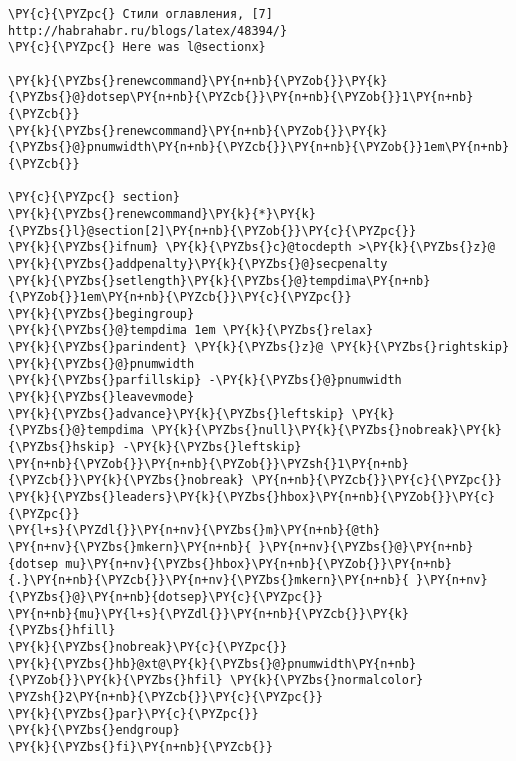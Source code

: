\begin{Verbatim}[commandchars=\\\{\}]
\PY{c}{\PYZpc{} Стили оглавления, [7] http://habrahabr.ru/blogs/latex/48394/}
\PY{c}{\PYZpc{} Here was l@sectionx}

\PY{k}{\PYZbs{}renewcommand}\PY{n+nb}{\PYZob{}}\PY{k}{\PYZbs{}@}dotsep\PY{n+nb}{\PYZcb{}}\PY{n+nb}{\PYZob{}}1\PY{n+nb}{\PYZcb{}}
\PY{k}{\PYZbs{}renewcommand}\PY{n+nb}{\PYZob{}}\PY{k}{\PYZbs{}@}pnumwidth\PY{n+nb}{\PYZcb{}}\PY{n+nb}{\PYZob{}}1em\PY{n+nb}{\PYZcb{}}

\PY{c}{\PYZpc{} section}
\PY{k}{\PYZbs{}renewcommand}\PY{k}{*}\PY{k}{\PYZbs{}l}@section[2]\PY{n+nb}{\PYZob{}}\PY{c}{\PYZpc{}}
\PY{k}{\PYZbs{}ifnum} \PY{k}{\PYZbs{}c}@tocdepth >\PY{k}{\PYZbs{}z}@
\PY{k}{\PYZbs{}addpenalty}\PY{k}{\PYZbs{}@}secpenalty
\PY{k}{\PYZbs{}setlength}\PY{k}{\PYZbs{}@}tempdima\PY{n+nb}{\PYZob{}}1em\PY{n+nb}{\PYZcb{}}\PY{c}{\PYZpc{}}
\PY{k}{\PYZbs{}begingroup}
\PY{k}{\PYZbs{}@}tempdima 1em \PY{k}{\PYZbs{}relax}
\PY{k}{\PYZbs{}parindent} \PY{k}{\PYZbs{}z}@ \PY{k}{\PYZbs{}rightskip} \PY{k}{\PYZbs{}@}pnumwidth
\PY{k}{\PYZbs{}parfillskip} -\PY{k}{\PYZbs{}@}pnumwidth
\PY{k}{\PYZbs{}leavevmode}
\PY{k}{\PYZbs{}advance}\PY{k}{\PYZbs{}leftskip} \PY{k}{\PYZbs{}@}tempdima \PY{k}{\PYZbs{}null}\PY{k}{\PYZbs{}nobreak}\PY{k}{\PYZbs{}hskip} -\PY{k}{\PYZbs{}leftskip}
\PY{n+nb}{\PYZob{}}\PY{n+nb}{\PYZob{}}\PYZsh{}1\PY{n+nb}{\PYZcb{}}\PY{k}{\PYZbs{}nobreak} \PY{n+nb}{\PYZcb{}}\PY{c}{\PYZpc{}}
\PY{k}{\PYZbs{}leaders}\PY{k}{\PYZbs{}hbox}\PY{n+nb}{\PYZob{}}\PY{c}{\PYZpc{}}
\PY{l+s}{\PYZdl{}}\PY{n+nv}{\PYZbs{}m}\PY{n+nb}{@th}
\PY{n+nv}{\PYZbs{}mkern}\PY{n+nb}{ }\PY{n+nv}{\PYZbs{}@}\PY{n+nb}{dotsep mu}\PY{n+nv}{\PYZbs{}hbox}\PY{n+nb}{\PYZob{}}\PY{n+nb}{.}\PY{n+nb}{\PYZcb{}}\PY{n+nv}{\PYZbs{}mkern}\PY{n+nb}{ }\PY{n+nv}{\PYZbs{}@}\PY{n+nb}{dotsep}\PY{c}{\PYZpc{}}
\PY{n+nb}{mu}\PY{l+s}{\PYZdl{}}\PY{n+nb}{\PYZcb{}}\PY{k}{\PYZbs{}hfill}
\PY{k}{\PYZbs{}nobreak}\PY{c}{\PYZpc{}}
\PY{k}{\PYZbs{}hb}@xt@\PY{k}{\PYZbs{}@}pnumwidth\PY{n+nb}{\PYZob{}}\PY{k}{\PYZbs{}hfil} \PY{k}{\PYZbs{}normalcolor} \PYZsh{}2\PY{n+nb}{\PYZcb{}}\PY{c}{\PYZpc{}}
\PY{k}{\PYZbs{}par}\PY{c}{\PYZpc{}}
\PY{k}{\PYZbs{}endgroup}
\PY{k}{\PYZbs{}fi}\PY{n+nb}{\PYZcb{}}


\end{Verbatim}
